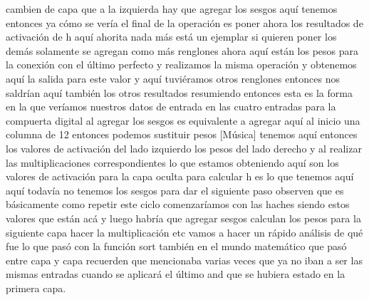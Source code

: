 cambien de capa que a la izquierda hay que agregar los sesgos aquí tenemos entonces ya cómo se vería el final de la operación es poner ahora los resultados de activación de h aquí ahorita nada más está un ejemplar si quieren poner los demás solamente se agregan como más renglones ahora aquí están los pesos para la conexión con el último perfecto y realizamos la misma operación y obtenemos aquí la salida para este valor y aquí tuviéramos otros renglones entonces nos saldrían aquí también los otros resultados resumiendo entonces esta es la forma en la que veríamos nuestros datos de entrada en las cuatro entradas para la compuerta digital al agregar los sesgos es equivalente a agregar aquí al inicio una columna de 12 entonces podemos sustituir pesos [Música] tenemos aquí entonces los valores de activación del lado izquierdo los pesos del lado derecho y al realizar las multiplicaciones correspondientes lo que estamos obteniendo aquí son los valores de activación para la capa oculta para calcular h es lo que tenemos aquí aquí todavía no tenemos los sesgos para dar el siguiente paso observen que es básicamente como repetir este ciclo comenzaríamos con las haches siendo estos valores que están acá y luego habría que agregar sesgos calculan los pesos para la siguiente capa hacer la multiplicación etc vamos a hacer un rápido análisis de qué fue lo que pasó con la función sort también en el mundo matemático que pasó entre capa y capa recuerden que mencionaba varias veces que ya no iban a ser las mismas entradas cuando se aplicará el último and que se hubiera estado en la primera capa.

